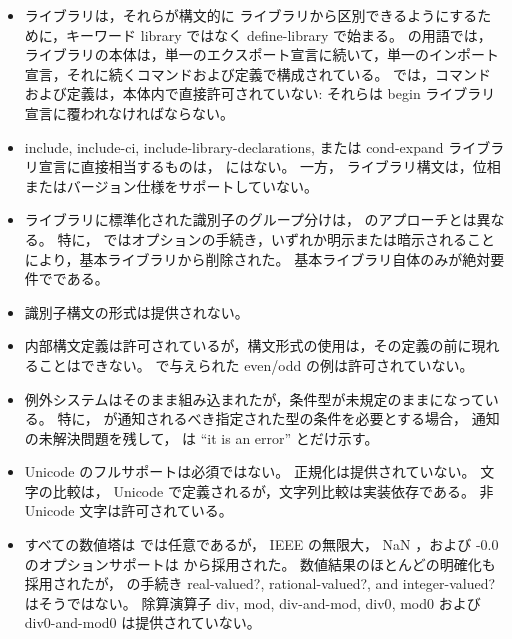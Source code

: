 \begin{itemize}
\item \rsevenrs ライブラリは，それらが構文的に \rsixrs ライブラリから区別できるようにするために，キーワード {\cf library} ではなく {\cf define-library} で始まる。
\rsevenrs の用語では， \rsixrs ライブラリの本体は，単一のエクスポート宣言に続いて，単一のインポート宣言，それに続くコマンドおよび定義で構成されている。
\rsevenrs では，コマンドおよび定義は，本体内で直接許可されていない: それらは {\cf begin} ライブラリ宣言に覆われなければならない。

\item {\cf include}, {\cf include-ci}, {\cf include-library-declarations}, または {\cf cond-expand} ライブラリ宣言に直接相当するものは， \rsixrs にはない。
一方， \rsevenrs ライブラリ構文は，位相またはバージョン仕様をサポートしていない。

\item ライブラリに標準化された識別子のグループ分けは， \rsixrs のアプローチとは異なる。
特に， \rfivers ではオプションの手続き，いずれか明示または暗示されることにより，基本ライブラリから削除された。
基本ライブラリ自体のみが絶対要件でである。

\item 識別子構文の形式は提供されない。

\item 内部構文定義は許可されているが，構文形式の使用は，その定義の前に現れることはできない。
\rsixrs で与えられた {\cf even}/{\cf odd} の例は許可されていない。

\item \rsixrs 例外システムはそのまま組み込まれたが，条件型が未規定のままになっている。
特に， \rsixrs が通知されるべき指定された型の条件を必要とする場合，
通知の未解決問題を残して， \rsevenrs は ``it is an error'' とだけ示す。

\item Unicode のフルサポートは必須ではない。
正規化は提供されていない。
文字の比較は， Unicode で定義されるが，文字列比較は実装依存である。
非 Unicode 文字は許可されている。

\item すべての数値塔は \rfivers では任意であるが， IEEE の無限大， NaN ，および {\mbox -0.0} のオプションサポートは \rsixrs から採用された。
数値結果のほとんどの明確化も採用されたが， \rsixrs の手続き {\cf real-valued?}, {\cf rational-valued?}, and {\cf integer-valued?} はそうではない。
\rsixrs 除算演算子 {\cf div}, {\cf mod}, {\cf div-and-mod}, {\cf div0}, {\cf mod0} および {\cf div0-and-mod0} は提供されていない。


\end{itemize}
